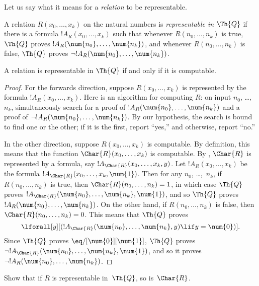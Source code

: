 \documentclass[../../../include/open-logic-section]{subfiles}
\begin{document}

Let us say what it means for a \emph{relation} to be representable.

\begin{defn}
 A relation $R(x_0,\dots,x_k)$ on
the natural numbers is {\em representable in $\Th{Q}$} if there is a
formula $!A_R(x_0,\dots,x_k)$ such that whenever $R(n_0,\dots,n_k)$ is
true, $\Th{Q}$ proves $!A_R(\num{n_0},\dots,\num{n_k})$, and whenever
$R(n_0,\dots,n_k)$ is false, $\Th{Q}$ proves $\lnot !A_R(\num{n_0},
\dots, \num{n_k})$.
\end{defn}

\begin{thm}
 A relation is representable in
$\Th{Q}$ if and only if it is computable.
\end{thm}

\begin{proof}
For the forwards direction, suppose $R(x_0,\dots,x_k)$ is
represented by the formula $!A_R(x_0,\dots,x_k)$. Here is an
algorithm for computing $R$: on input $n_0$, \dots,~$n_k$, simultaneously
search for a proof of $!A_R(\num{n_0}, \dots, \num{n_k})$ and a proof of
$\lnot !A_R(\num{n_0}, \dots, \num{n_k})$. By our hypothesis, the search
is bound to find one or the other; if it is the first, report ``yes,''
and otherwise, report ``no.''

In the other direction, suppose $R(x_0, \dots, x_k)$ is computable. By
definition, this means that the function $\Char{R}(x_0, \dots, x_k)$
is computable. By , $\Char{R}$
is represented by a formula, say $!A_{\Char{R}}(x_0, \dots, x_k,
y)$. Let $!A_R(x_0, \dots, x_k)$ be the formula $!A_{\Char{R}}(x_0,
\dots, x_k, \num{1})$. Then for any $n_0$, \dots,~$n_k$, if $R(n_0,
\dots, n_k)$ is true, then $\Char{R}(n_0, \dots, n_k) = 1$, in which
case $\Th{Q}$ proves $!A_{\Char{R}}(\num{n_0}, \dots, \num{n_k},
\num{1})$, and so $\Th{Q}$ proves $!A_R(\num{n_0}, \dots,
\num{n_k})$. On the other hand, if $R(n_0, \dots, n_k)$ is false, then
$\Char{R}(n_0, \dots, n_k) = 0$. This means that $\Th{Q}$ proves
\[
\lforall[y][(!A_{\Char{R}}(\num{n_0}, \dots, \num{n_k}, y) \lif y =
  \num{0})].
\]
Since $\Th{Q}$ proves $\eq/[\num{0}][\num{1}]$, $\Th{Q}$ proves
$\lnot !A_{\Char{R}}(\num{n_0}, \dots, \num{n_k}, \num{1})$, and so it
proves $\lnot !A_R(\num{n_0}, \dots, \num{n_k})$.
\end{proof}

\begin{prob}
Show that if $R$ is representable in~$\Th{Q}$, so is~$\Char{R}$.
\end{prob}
\end{document}
